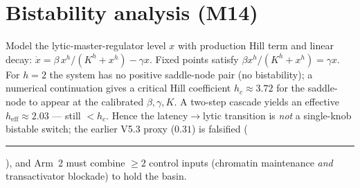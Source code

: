 \documentclass[11pt,a4paper]{article}
\newcommand{\tierdisc}[1]{\textcolor{#1}{\rule[0.05ex]{1.0ex}{1.0ex}}}
\newcommand{\tierRed}{\tierdisc{red!80!black}}
\begin{document}
\section{Bistability analysis (M14)}
\label{app:m14}
Model the lytic-master-regulator level $x$ with production Hill term and linear
decay: $\dot x = \beta\,x^{h}/(K^{h}+x^{h}) - \gamma x$. Fixed points satisfy
$\beta x^{h}/(K^h+x^h)=\gamma x$. For $h=2$ the system has no positive saddle-node
pair (no bistability); a numerical continuation gives a critical Hill
coefficient $h_c\approx 3.72$ for the saddle-node to appear at the calibrated
$\beta,\gamma,K$. A two-step cascade yields an effective $h_{\mathrm{eff}}\approx
2.03$ --- still $<h_c$. Hence the latency$\to$lytic transition is \emph{not} a
single-knob bistable switch; the earlier V5.3 proxy ($0.31$) is falsified
(\tierRed{}), and Arm~2 must combine $\ge2$ control inputs (chromatin
maintenance \emph{and} transactivator blockade) to hold the basin.



\end{document}
